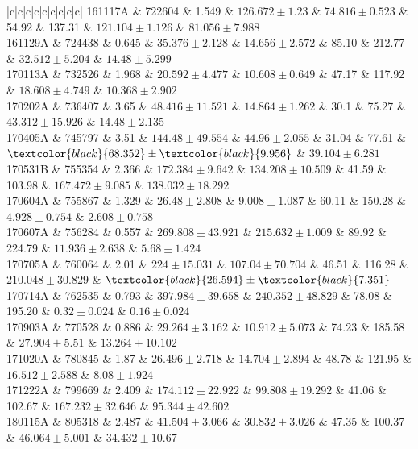 \documentclass[prd,nofootinbib,preprintnumbers,floatfix]{revtex4}  %
\newcommand{\rthis}[1]{\textcolor{black}{#1}}
\begin{document}
\begin{center}
\begin{longtable*}{|c|c|c|c|c|c|c|c|c|}
161117A	&	722604	&	1.549	&	$	126.672	\pm	1.23	$	&	$	74.816	\pm	0.523	$	&	54.92	&	137.31	&	$	121.104	\pm	1.126	$	&	$	81.056	\pm	7.988	$	\\
161129A	&	724438	&	0.645	&	$	35.376	\pm	2.128	$	&	$	14.656	\pm	2.572	$	&	85.10	&	212.77	&	$	32.512	\pm	5.204	$	&	$	14.48	\pm	5.299	$	\\
170113A	&	732526	&	1.968	&	$	20.592	\pm	4.477	$	&	$	10.608	\pm	0.649	$	&	47.17	&	117.92	&	$	18.608	\pm	4.749	$	&	$	10.368	\pm	2.902	$	\\
170202A	&	736407	&	3.65	&	$	48.416	\pm	11.521	$	&	$	14.864	\pm	1.262	$	&	30.1	&	75.27	&	$	43.312	\pm	15.926	$	&	$	14.48	\pm	2.135	$	\\
170405A	&	745797	&	3.51	&	$	144.48	\pm	49.554	$	&	$	44.96	\pm	2.055	$	&	31.04	&	77.61	&	$	\rthis{68.352}	\pm	\rthis{9.956}	$	&	$	39.104	\pm	6.281	$	\\
170531B	&	755354	&	2.366	&	$	172.384	\pm	9.642	$	&	$	134.208	\pm	10.509	$	&	41.59	&	103.98	&	$	167.472	\pm	9.085	$	&	$	138.032	\pm	18.292	$	\\
170604A	&	755867	&	1.329	&	$	26.48	\pm	2.808	$	&	$	9.008	\pm	1.087	$	&	60.11	&	150.28	&	$	4.928	\pm	0.754	$	&	$	2.608	\pm	0.758	$	\\
170607A	&	756284	&	0.557	&	$	269.808	\pm	43.921	$	&	$	215.632	\pm	1.009	$	&	89.92	&	224.79	&	$	11.936	\pm	2.638	$	&	$	5.68	\pm	1.424	$	\\
170705A	&	760064	&	2.01	&	$	224	\pm	15.031	$	&	$	107.04	\pm	70.704	$	&	46.51	&	116.28	&	$	210.048	\pm	30.829	$	&	$	\rthis{26.594}	\pm	\rthis{7.351}	$	\\
170714A	&	762535	&	0.793	&	$	397.984	\pm	39.658	$	&	$	240.352	\pm	48.829	$	&	78.08	&	195.20	&	$	0.32	\pm	0.024	$	&	$	0.16	\pm	0.024	$	\\
170903A	&	770528	&	0.886	&	$	29.264	\pm	3.162	$	&	$	10.912	\pm	5.073	$	&	74.23	&	185.58	&	$	27.904	\pm	5.51	$	&	$	13.264	\pm	10.102	$	\\
171020A	&	780845	&	1.87	&	$	26.496	\pm	2.718	$	&	$	14.704	\pm	2.894	$	&	48.78	&	121.95	&	$	16.512	\pm	2.588	$	&	$	8.08	\pm	1.924	$	\\
171222A	&	799669	&	2.409	&	$	174.112	\pm	22.922	$	&	$	99.808	\pm	19.292	$	&	41.06	&	102.67	&	$	167.232	\pm	32.646	$	&	$	95.344	\pm	42.602	$	\\
180115A	&	805318	&	2.487	&	$	41.504	\pm	3.066	$	&	$	30.832	\pm	3.026	$	&	47.35	&	100.37	&	$	46.064	\pm	5.001	$	&	$	34.432	\pm	10.67	$	\\

\end{longtable*}
\end{center}
\end{document}
